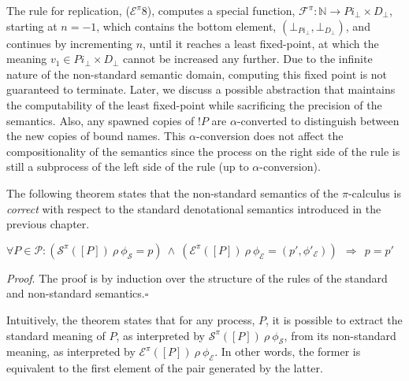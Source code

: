 \documentclass[10pt,a4paper,final,oneside,fleqn]{book}
\begin{document}
The rule for replication, ($\mathcal{E}^\pi 8$), computes a special function, $\mathcal{F}^\pi:\mathbb{N}\to Pi_\bot\times D_\bot$, starting at $n=-1$, which contains the bottom element, $(\bot_{Pi_\bot},\bot_{D_\bot})$, and continues by incrementing $n$, until it reaches a least fixed-point, at which the meaning $v_1\in Pi_\bot\times D_\bot$ cannot be increased any further. Due to the infinite nature of the non-standard semantic domain, computing this fixed point is not guaranteed to terminate. Later, we discuss a possible abstraction that maintains the computability of the least fixed-point while sacrificing the precision of the semantics. Also, any spawned copies of $!P$ are $\alpha$-converted to distinguish between the new copies of bound names.  This $\alpha$-conversion does not affect the compositionality of the semantics since the process on the right side of the rule is still a subprocess of the left side of the rule (up to $\alpha$-conversion).

The following theorem states that the non-standard semantics of the $\pi$-calculus is {\itshape correct\/} with respect to the standard denotational semantics introduced in the previous chapter.
\begin{theor}\label{correctpi}
$ $\\
$\forall P\in\mathcal{P}:(\mathcal{S}^\pi(\![P]\!)~\rho~\phi_\mathcal{S}=p)~\wedge~(\mathcal{E}^\pi(\![P]\!)~\rho~\phi_\mathcal{E}=(p',\phi'_\mathcal{E}))~~\Rightarrow~~p=p'$
\end{theor}
{\itshape Proof\/}. The proof is by induction over the structure of the rules of the standard and non-standard semantics.\hfill$\square$

Intuitively, the theorem states that for any process, $P$, it is possible to extract the standard meaning of $P$, as interpreted by $\mathcal{S}^\pi(\![P]\!)~\rho~\phi_\mathcal{S}$, from its non-standard meaning, as interpreted by $\mathcal{E}^\pi(\![P]\!)~\rho~\phi_\mathcal{E}$.  In other words, the former is equivalent to the first element of the pair generated by the latter.
\end{document}
